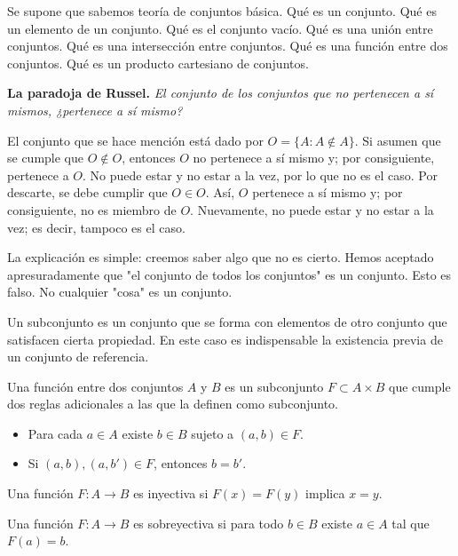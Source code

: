 \documentclass[main.tex]{subfiles}
\begin{document}
Se supone que sabemos teor\'ia de conjuntos b\'asica. Qu\'e es un conjunto. Qu\'e es un elemento de un conjunto. Qu\'e es el conjunto vac\'io. Qu\'e es una uni\'on entre conjuntos. Qu\'e es una intersecci\'on entre conjuntos. Qu\'e es una funci\'on entre dos conjuntos. Qu\'e es un producto cartesiano de conjuntos.

\medskip
\noindent
\textbf{La paradoja de Russel.}
\textit{El conjunto de los conjuntos que no pertenecen a s\'i mismos, ¿pertenece a s\'i mismo?}

El conjunto que se hace menci\'on est\'a dado por $O = \{ A : A \not \in A \}$.
Si asumen que se cumple que $O \not \in O$, entonces $O$ no pertenece a s\'i mismo y; por consiguiente, pertenece a $O$. No puede estar y no estar a la vez, por lo que no es el caso.
Por descarte, se debe cumplir que $O \in O$. As\'i, $O$ pertenece a s\'i mismo y; por consiguiente, no es miembro de $O$. Nuevamente, no puede estar y no estar a la vez; es decir, tampoco es el caso.

La explicaci\'on es simple: creemos saber algo que no es cierto. Hemos aceptado apresuradamente que "el conjunto de todos los conjuntos" es un conjunto. Esto es falso. No cualquier "cosa" es un conjunto.

\medskip
Un subconjunto es un conjunto que se forma con elementos de otro conjunto que satisfacen cierta propiedad. En este caso es indispensable la existencia previa de un conjunto de referencia.

\begin{defn}
    Una funci\'on entre dos conjuntos $A$ y $B$ es un subconjunto $F \subset A \times B$ que cumple dos reglas adicionales a las que la definen como subconjunto.
    \begin{itemize}
        \item Para cada $a \in A$ existe $b \in B$ sujeto a $(a, b) \in F$.
        \item Si $(a, b), (a, b') \in F$, entonces $b = b'$.
    \end{itemize}
\end{defn}

\begin{defn}
    Una funci\'on $F : A \to B$ es inyectiva si $F(x) = F(y)$ implica $x = y$.
\end{defn}

\begin{defn}
    Una funci\'on $F: A \to B$ es sobreyectiva si para todo $b \in B$ existe $a \in A$ tal que $F(a) = b$.
\end{defn}
\end{document}
